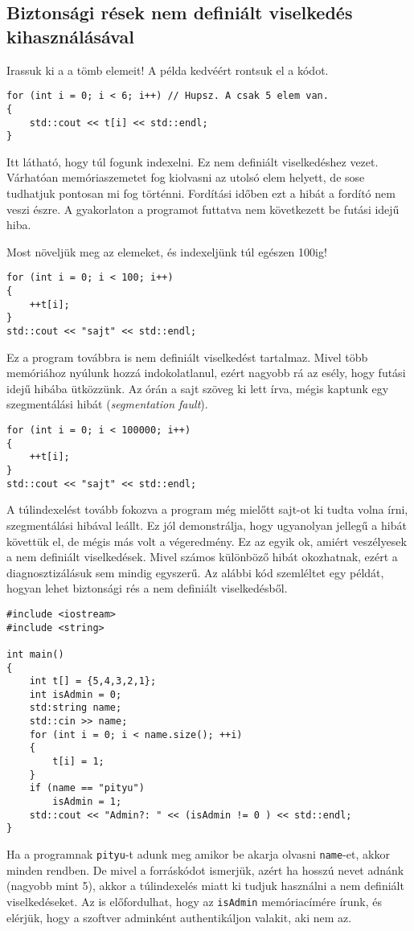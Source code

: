\documentclass[a4paper,11.5pt,table]{article}
\begin{document}
		\subsection{Biztonsági rések nem definiált viselkedés kihasználásával}
		Irassuk ki a a tömb elemeit! A példa kedvéért rontsuk el a kódot.
		\begin{lstlisting}
for (int i = 0; i < 6; i++) // Hupsz. A csak 5 elem van.
{
	std::cout << t[i] << std::endl;
}
		\end{lstlisting} 
		Itt látható, hogy túl fogunk indexelni. Ez {nem definiált viselkedés}hez vezet. Várhatóan memóriaszemetet fog kiolvasni az utolsó elem helyett, de sose tudhatjuk pontosan mi fog történni. Fordítási időben ezt a hibát a fordító nem veszi észre. A gyakorlaton a programot futtatva nem következett be futási idejű hiba.
		
		Most növeljük meg az elemeket, és indexeljünk túl egészen 100ig!
		\begin{lstlisting}
for (int i = 0; i < 100; i++)
{
	++t[i];
}
std::cout << "sajt" << std::endl;
		\end{lstlisting} 
		Ez a program továbbra is nem definiált viselkedést tartalmaz. Mivel több memóriához nyúlunk hozzá indokolatlanul, ezért nagyobb rá az esély, hogy futási idejű hibába ütközzünk. Az órán a {sajt} szöveg ki lett írva, mégis kaptunk egy szegmentálási hibát (\textit{segmentation fault}).
		
		\begin{lstlisting}
for (int i = 0; i < 100000; i++)
{
	++t[i];
}
std::cout << "sajt" << std::endl;
		\end{lstlisting} 
		A túlindexelést tovább fokozva a program még mielőtt sajt-ot ki tudta volna írni, szegmentálási hibával leállt. Ez jól demonstrálja, hogy ugyanolyan jellegű  a hibát követtük el, de mégis más volt a végeredmény. Ez az egyik ok, amiért veszélyesek a nem definiált viselkedések. Mivel számos különböző hibát okozhatnak, ezért a diagnosztizálásuk sem mindig egyszerű. Az alábbi kód szemléltet egy példát, hogyan lehet biztonsági rés a nem definiált viselkedésből.
		\begin{lstlisting}
#include <iostream>
#include <string>

int main()
{
	int t[] = {5,4,3,2,1};
	int isAdmin = 0;
	std:string name;
	std::cin >> name;
	for (int i = 0; i < name.size(); ++i)
	{
		t[i] = 1;
	}
	if (name == "pityu")
		isAdmin = 1;
	std::cout << "Admin?: " << (isAdmin != 0 ) << std::endl;
}
		\end{lstlisting}
		Ha a programnak \texttt{pityu}-t adunk meg amikor be akarja olvasni \texttt{name}-et, akkor minden rendben. De mivel a forráskódot ismerjük, azért ha hosszú nevet adnánk (nagyobb mint 5), akkor a túlindexelés miatt ki tudjuk használni a nem definiált viselkedéseket. Az is előfordulhat, hogy az \texttt{isAdmin} memóriacímére írunk, és elérjük, hogy a szoftver adminként authentikáljon valakit, aki nem az.
		\medskip
		
\end{document}
